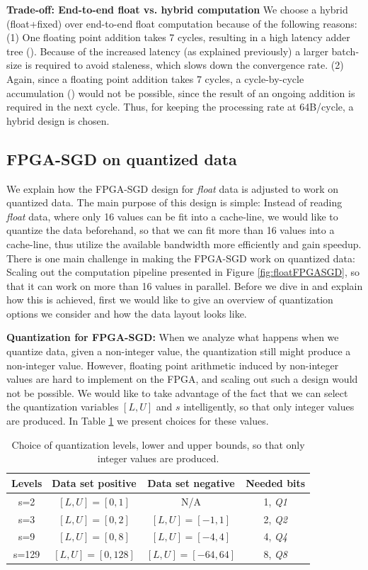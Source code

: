 \documentclass{article}
\newcommand*\circled[1]{\tikz[baseline=(char.base)]{
\node[shape=circle,draw,color=black,text=black,inner sep=0.05pt](char){#1};}}
\begin{document}
\noindent
\textbf{Trade-off: End-to-end float vs. hybrid computation} We choose a hybrid (float+fixed) over end-to-end float computation because of the following reasons: (1) One floating point addition takes 7 cycles, resulting in a high latency adder tree (\circled{3}). Because of the increased latency (as explained previously) a larger batch-size is required to avoid staleness, which slows down the convergence rate. (2) Again, since a floating point addition takes 7 cycles, a cycle-by-cycle accumulation (\circled{7}) would not be possible, since the result of an ongoing addition is required in the next cycle. Thus, for keeping the processing rate at 64B/cycle, a hybrid design is chosen.

\subsection{FPGA-SGD on \textbf{quantized} data}
\label{section:qfpgasgd}

We explain how the FPGA-SGD design for \textit{float} data is adjusted to work on quantized data. The main purpose of this design is simple: Instead of reading \textit{float} data, where only 16 values can be fit into a cache-line, we would like to quantize the data beforehand, so that we can fit more than 16 values into a cache-line, thus utilize the available bandwidth more efficiently and gain speedup. There is one main challenge in making the FPGA-SGD work on quantized data: Scaling out the computation pipeline presented in Figure \ref{fig:floatFPGASGD}, so that it can work on more than 16 values in parallel. Before we dive in and explain how this is achieved, first we would like to give an overview of quantization options we consider and how the data layout looks like.

\noindent
\textbf{Quantization for FPGA-SGD:} When we analyze what happens when we quantize data, given a non-integer value, the quantization still might produce a non-integer value. However, floating point arithmetic induced by non-integer values are hard to implement on the FPGA, and scaling out such a design would not be possible. We would like to take advantage of the fact that we can select the quantization variables $[L,U]$ and $s$ intelligently, so that only integer values are produced. In Table \ref{table:quantization} we present choices for these values.

\begin{table}[t]
\centering
\caption{Choice of quantization levels, lower and upper bounds, so that only integer values are produced.}
\label{table:quantization}
\begin{tabular}{c|c|c|c}
Levels & Data set positive & Data set negative & Needed bits\\
\hline
s=2 & $[L,U]=[0,1]$ & N/A & 1, \textit{Q1} \\
s=3 & $[L,U]=[0,2]$ & $[L,U]=[-1,1]$ & 2, \textit{Q2} \\
s=9 & $[L,U]=[0,8]$ & $[L,U]=[-4,4]$ & 4, \textit{Q4} \\
s=129 & $[L,U]=[0,128]$ & $[L,U]=[-64,64]$ & 8, \textit{Q8}
\end{tabular}
\end{table}
\end{document}
